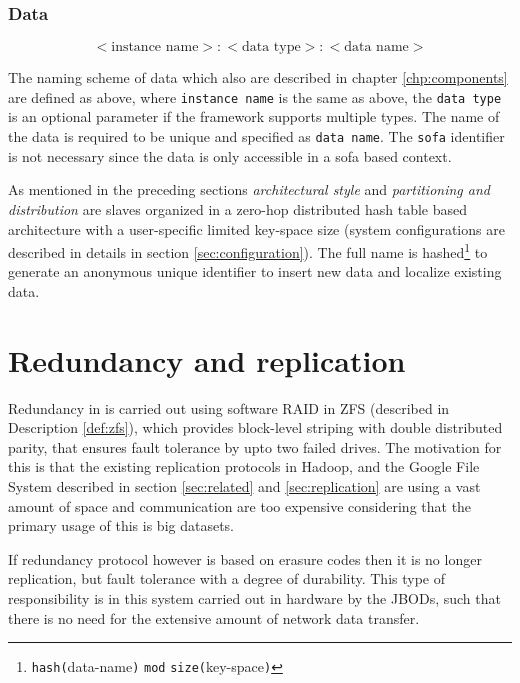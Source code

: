 \subsubsection*{Data}
\begin{equation*}
	<\text{instance name}>:<\text{data type}>:<\text{data name}>
\end{equation*}
\vspace*{1mm}

The naming scheme of data which also are described in chapter \ref{chp:components} are defined as above, where \texttt{instance name} is the same as above, the \texttt{data type} is an optional parameter if the framework supports multiple types. The name of the data is required to be unique and specified as \texttt{data name}. The \texttt{sofa} identifier is not necessary since the data is only accessible in a sofa based context.
\newline

As mentioned in the preceding sections \textit{architectural style} and \textit{partitioning and distribution} are slaves organized in a zero-hop distributed hash table based architecture with a user-specific limited key-space size (system configurations are described in details in section \ref{sec:configuration}). The full name is hashed\footnote{\texttt{hash(}data-name\texttt{)} \texttt{mod} \texttt{size(}key-space\texttt{)}} to generate an anonymous unique identifier to insert new data and localize existing data.

\section{Redundancy and replication}
Redundancy in \CodeName is carried out using \eg software RAID in ZFS (described in Description \ref{def:zfs}), which provides block-level striping with double distributed parity, that ensures fault tolerance by upto two failed drives. The motivation for this is that the existing replication protocols in \eg Hadoop, and the Google File System described in section \ref{sec:related} and \ref{sec:replication} are using a vast amount of space and communication are too expensive considering that the primary usage of this is big datasets.
\newline

If redundancy protocol however is based on erasure codes then it is no longer replication, but fault tolerance with a degree of durability. This type of responsibility is in this system carried out in hardware by the JBODs, such that there is no need for the extensive amount of network data transfer.
\vspace*{2mm}

